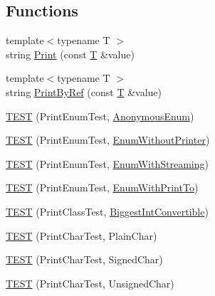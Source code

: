 \subsection*{Functions}
\begin{DoxyCompactItemize}
\item 
{\footnotesize template$<$typename T $>$ }\\string \hyperlink{namespacetesting_1_1gtest__printers__test_adab26e59d2d7781c06a2c1c5948a8f65}{Print} (const \hyperlink{functions__7_8js_adf1f3edb9115acb0a1e04209b7a9937b}{T} \&value)
\item 
{\footnotesize template$<$typename T $>$ }\\string \hyperlink{namespacetesting_1_1gtest__printers__test_a8e4be1dea6a05e53db4fd20d259ffdd7}{Print\+By\+Ref} (const \hyperlink{functions__7_8js_adf1f3edb9115acb0a1e04209b7a9937b}{T} \&value)
\item 
\hyperlink{namespacetesting_1_1gtest__printers__test_ac79ac1529e754dddbaff5ba108ba3de3}{T\+E\+ST} (Print\+Enum\+Test, \hyperlink{gtest-printers__test_8cc_a7a5ee9fe858568a85d80af1312aefb8b}{Anonymous\+Enum})
\item 
\hyperlink{namespacetesting_1_1gtest__printers__test_ae435934e9be88c7813ac6aee2ce0ce53}{T\+E\+ST} (Print\+Enum\+Test, \hyperlink{gtest-printers__test_8cc_a404f735da62338180a19ae16f80e09c8}{Enum\+Without\+Printer})
\item 
\hyperlink{namespacetesting_1_1gtest__printers__test_a152cda5e11caecc372208103022726d1}{T\+E\+ST} (Print\+Enum\+Test, \hyperlink{gtest-printers__test_8cc_a52d9f846ca7a081ba3acf88dd6cd46dc}{Enum\+With\+Streaming})
\item 
\hyperlink{namespacetesting_1_1gtest__printers__test_a171e23e5a52e6b7355c00daf8391ec12}{T\+E\+ST} (Print\+Enum\+Test, \hyperlink{gtest-printers__test_8cc_a904d619d593201ed509be794aed041ec}{Enum\+With\+Print\+To})
\item 
\hyperlink{namespacetesting_1_1gtest__printers__test_a46ee2873cfeb51db5f56be0960ce333b}{T\+E\+ST} (Print\+Class\+Test, \hyperlink{class_biggest_int_convertible}{Biggest\+Int\+Convertible})
\item 
\hyperlink{namespacetesting_1_1gtest__printers__test_aa0a012b88bd8dee46707bf308aa312d1}{T\+E\+ST} (Print\+Char\+Test, Plain\+Char)
\item 
\hyperlink{namespacetesting_1_1gtest__printers__test_a08fe11b61c0ff62931f0172dc05c971b}{T\+E\+ST} (Print\+Char\+Test, Signed\+Char)
\item 
\hyperlink{namespacetesting_1_1gtest__printers__test_a54554ba079349cf09dcb6d522cfb70de}{T\+E\+ST} (Print\+Char\+Test, Unsigned\+Char)

\end{DoxyCompactItemize}
